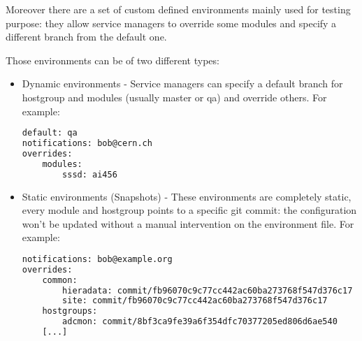 Moreover there are a set of custom defined environments mainly used for
testing purpose: they allow service managers to override some modules and
specify a different branch from the default one.

Those environments can be of two different types:

\begin{itemize} 
    \item Dynamic environments - Service managers can specify a default branch for
hostgroup and modules (usually master or qa) and override others. For
example:

\begin{lstlisting}[language=bash, frame=single]
default: qa
notifications: bob@cern.ch
overrides:
    modules:
        sssd: ai456
\end{lstlisting}

    \item Static environments (Snapshots) - These environments are completely static,
every module and hostgroup points to a specific git commit: the
configuration won't be updated without a manual intervention on the
environment file. For example:

\begin{lstlisting}[language=bash, frame=single]
notifications: bob@example.org
overrides:
    common:
        hieradata: commit/fb96070c9c77cc442ac60ba273768f547d376c17
        site: commit/fb96070c9c77cc442ac60ba273768f547d376c17
    hostgroups:
        adcmon: commit/8bf3ca9fe39a6f354dfc70377205ed806d6ae540
    [...]
\end{lstlisting}
\end{itemize}


